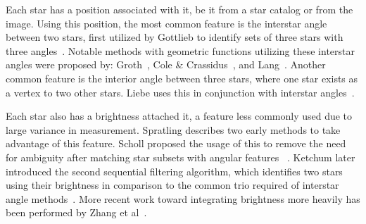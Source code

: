 Each star has a position associated with it, be it from a star catalog or from the image.
Using this position, the most common feature is the interstar angle between two stars, first utilized by Gottlieb to
identify sets of three stars with three angles~\cite{gottlieb:spacecraftAttitudeDetermination}.
Notable methods with geometric functions utilizing these interstar angles were proposed by:
Groth~\cite{groth:patternMatchingMethod}, Cole \&
Crassidus~\cite{coleAndCrassidis:sphericalTriangleMethod,coleAndCrassidis:planarTriangleMethod}, and
Lang~\cite{lang:astrometryDotNet}.
Another common feature is the interior angle between three stars, where one star exists as a vertex to two other stars.
Liebe uses this in conjunction with interstar angles~\cite{liebe:starTrackersAttitudeDetermination}.



Each star also has a brightness attached it, a feature less commonly used due to large variance in measurement.
Spratling describes two early methods to take advantage of this feature.
Scholl proposed the usage of this to remove the need for ambiguity after matching star subsets with angular features
~\cite{scholl:starFieldIdentification}.
Ketchum later introduced the second sequential filtering algorithm, which identifies two stars using their brightness
in comparison to the common trio required of interstar angle methods~\cite{ketchum:onboardStarIdentification}.
More recent work toward integrating brightness more heavily has been performed by Zhang et
al~\cite{zhang:brightnessReferenced}.

